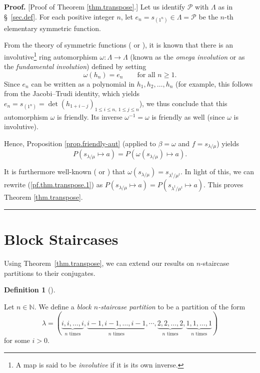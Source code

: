 \documentclass[numbers=enddot,12pt,final,onecolumn,notitlepage]{scrartcl}%
\theoremstyle{definition}
\newtheorem{defi}[theo]{Definition}
\newenvironment{definition}[1][]
{\begin{defi}[#1]\begin{leftbar}}
{\end{leftbar}\end{defi}}
\newenvironment{proof}[1][Proof]{\noindent\textbf{#1.} }{\ \rule{0.5em}{0.5em}}
\newcommand{\NN}{\mathbb{N}}
\renewcommand{\leq}{\leqslant}
\renewcommand{\geq}{\geqslant}
\theoremstyle{plainsl}
\begin{document}
\begin{proof}
[Proof of Theorem \ref{thm.transpose}.] Let us identify $\mathcal{P}$ with
$\Lambda$ as in \S \ \ref{sec.def}. For each positive integer $n$, let
$e_{n}=s_{\left(  1^{n}\right)  }\in\Lambda=\mathcal{P}$ be the $n$-th
elementary symmetric function.

From the theory of symmetric functions (\cite[\S 7.6]{EC2} or \cite[(2.7)]%
{Macdonald}), it is known that there is an involutive\footnote{A map is said
to be \emph{involutive} if it is its own inverse.} ring automorphism
$\omega:\Lambda\rightarrow\Lambda$ (known as the \emph{omega involution} or as
the \emph{fundamental involution}) defined by setting
\[
\omega\left(  h_{n}\right)  =e_{n}\qquad\text{for all }n\geq1.
\]
Since $e_{n}$ can be written as a polynomial in $h_{1},h_{2},\ldots,h_{n}$
(for example, this follows from the Jacobi--Trudi identity, which yields
$e_{n}=s_{\left(  1^{n}\right)  }=\det\left(  h_{1+i-j}\right)  _{1\leq i\leq
n,\ 1\leq j\leq n}$), we thus conclude that this automorphism $\omega$ is
friendly. Its inverse $\omega^{-1}=\omega$ is friendly as well (since $\omega$
is involutive).

Hence, Proposition \ref{prop.friendly-aut} (applied to $\beta=\omega$ and
$f=s_{\lambda/\mu}$) yields%
\begin{equation}
P\left(  s_{\lambda/\mu}\mapsto a\right)  =P\left(  \omega\left(
s_{\lambda/\mu}\right)  \mapsto a\right)  .\label{pf.thm.transpose.1}%
\end{equation}


It is furthermore well-known (\cite[Theorem 7.15.6]{EC2} or \cite[(5.6)]%
{Macdonald}) that $\omega\left(  s_{\lambda/\mu}\right)  =s_{\lambda^{t}%
/\mu^{t}}$. In light of this, we can rewrite (\ref{pf.thm.transpose.1}) as
$P\left(  s_{\lambda/\mu}\mapsto a\right)  =P\left(  s_{\lambda^{t}/\mu^{t}%
}\mapsto a\right)  $. This proves Theorem \ref{thm.transpose}.
\end{proof}


\section{Block Staircases}

Using Theorem~\ref{thm.transpose}, we can extend our results on $n$-staircase
partitions to their conjugates.

\begin{definition}
Let $n\in \NN$.
We define a \emph{block $n$-staircase partition} to be a partition of the form 
\[\lambda = ( \underbrace{i,i,\ldots,i}_{n
\text{ times}}
,  \underbrace{i-1,i-1,\ldots,i-1}_{n
\text{ times}}
, \cdots,  \underbrace{2,2,\ldots,2}_{n
\text{ times}}
, \underbrace{1,1,\ldots,1}_{n
\text{ times}}
)
\]
for some $i > 0$.
\end{definition}
\end{document}
